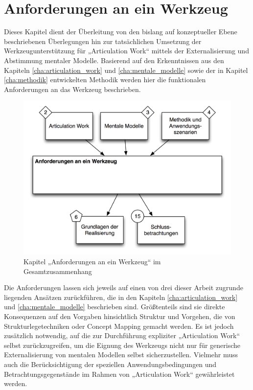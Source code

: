
\chapter{Anforderungen an ein Werkzeug} %
\label{cha:anforderungen}

Dieses Kapitel dient der Überleitung von den bislang auf konzeptueller Ebene beschriebenen Überlegungen hin zur tatsächlichen Umsetzung der Werkzeugunterstützung für „Articulation Work“ mittels der Externalisierung und Abstimmung mentaler Modelle. Basierend auf den Erkenntnissen aus den Kapiteln \ref{cha:articulation_work} und \ref{cha:mentale_modelle} sowie der in Kapitel \ref{cha:methodik} entwickelten Methodik werden hier die funktionalen Anforderungen an das Werkzeug beschrieben.

\begin{figure}[htbp]
	\centering
		\includegraphics[scale=0.75]{img/Kontextgrafiken/k5.png}
	\caption{Kapitel „Anforderungen an ein Werkzeug“ im Gesamtzusammenhang}
	\label{fig:img_Kontextgrafiken_k5}
\end{figure}

Die Anforderungen lassen sich jeweils auf einen von drei dieser Arbeit zugrunde liegenden Ansätzen zurückführen, die in den Kapiteln \ref{cha:articulation_work} und \ref{cha:mentale_modelle} beschrieben sind. Größtenteils sind sie direkte Konsequenzen auf den Vorgaben hinsichtlich Struktur und Vorgehen, die von Strukturlegetechniken oder Concept Mapping gemacht werden. Es ist jedoch zusätzlich notwendig, auf die zur Durchführung expliziter „Articulation Work“ selbst zurückzugreifen, um die Eignung des Werkzeugs nicht nur für generische Externalisierung von mentalen Modellen selbst sicherzustellen. Vielmehr muss auch die Berücksichtigung der speziellen Anwendungsbedingungen und Betrachtungsgegenstände im Rahmen von „Articulation Work“ gewährleistet werden.

